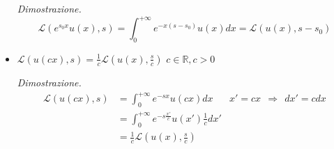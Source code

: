 \documentclass[10pt,a4paper,twoside]{book}
\begin{document}
\begin{itemize}
\textit{Dimostrazione.}\begin{equation*}
\mathcal{L}\left( e^{s_{0} x} u( x) ,s\right) =\int ^{+\infty }_{0} e^{-x( s-s_{0})} u( x) dx=\mathcal{L}( u( x) ,s-s_{0})
\end{equation*}
\item $\boxed{\mathcal{L}( u( cx) ,s) =\frac{1}{c}\mathcal{L}\left( u( x) ,\frac{s}{c}\right)}$ $\boxed{c\in \mathbb{R} ,c >0}$

\textit{Dimostrazione.}\begin{equation*}
\begin{aligned}
\mathcal{L}( u( cx) ,s) & =\int ^{+\infty }_{0} e^{-sx} u( cx) dx & x'=cx\ \ \Rightarrow \ \ dx'=cdx\\
 & =\int ^{+\infty }_{0} e^{-s\frac{x'}{c}} u( x')\frac{1}{c} dx' & \\
 & =\frac{1}{c}\mathcal{L}\left( u( x) ,\frac{s}{c}\right) & 
\end{aligned}
\end{equation*}
\end{itemize}
\end{document}
